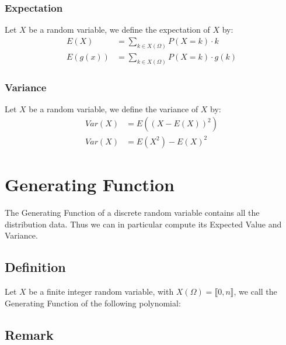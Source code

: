 \documentclass[notitlepage]{math}
\begin{document}
        \subsubsection{Expectation}
            Let $X$ be a random variable, we define the expectation of $X$ by:
            \begin{align*}
                E(X) &= \sum_{k \in X(\Omega)} P(X = k) \cdot k\\
                E(g(x)) &= \sum_{k \in X(\Omega)} P(X = k) \cdot g(k)
            \end{align*}
        \subsubsection{Variance}
            Let $X$ be a random variable, we define the variance of $X$ by:
            \begin{align*}
                Var(X) &= E((X - E(X))^2)\\
                Var(X) &= E(X^2) - E(X)^2
            \end{align*}


\section{Generating Function}
The Generating Function of a discrete random variable contains all the distribution data. Thus we can in particular compute its Expected Value and Variance.
\subsection{Definition}

Let $X$ be a finite integer random variable, with $X(\Omega) = \llbracket 0,n \rrbracket$, we call the Generating Function of the following polynomial:\\

\subsection{Remark}
\end{document}
